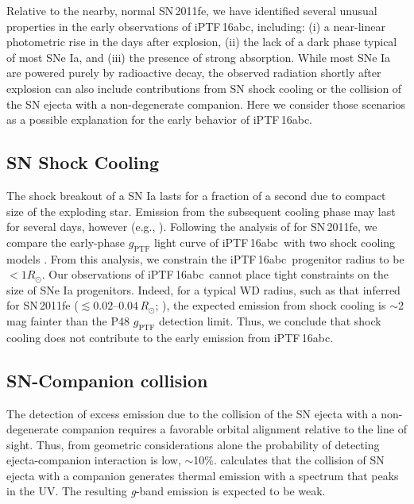 \documentclass[twocolumn]{aastex61}
\newcommand{\sr}{R_\odot}
\newcommand{\abc}{iPTF\,16abc}
\begin{document}
Relative to the nearby, normal SN\,2011fe, we have identified several unusual properties in the early observations of \abc, including: (i) a near-linear photometric rise in the days after explosion, (ii) the lack of a dark phase typical of most SNe Ia, and (iii) the presence of strong  absorption. While most SNe Ia are powered purely by radioactive decay, the observed radiation shortly after explosion can also include contributions 
from SN shock cooling or the collision of the SN ejecta with a non-degenerate companion. Here we consider those scenarios as a possible explanation for the early behavior of \abc. 

\subsection{SN Shock Cooling}

The shock breakout of a SN Ia lasts for a fraction of a second due to
compact size of the exploding star. Emission from the subsequent 
cooling phase may last for several days, however (e.g., 
\citealt{2010ApJ...708..598P}). Following the analysis of \citet{2012ApJ...744L..17B} for SN\,2011fe, we
compare the early-phase $g_\mathrm{PTF}$ light curve of \abc\ with
two shock cooling models \citep{2011ApJ...728...63R, 
2010ApJ...708..598P}. From this analysis, we constrain the \abc\ 
progenitor radius to be $<1\sr$. Our observations of \abc\ cannot 
place tight constraints on the size of SNe Ia progenitors. Indeed, 
for a typical WD radius, such as that inferred for SN\,2011fe 
($\lesssim 0.02$--$0.04\,\sr$; \citealt{2012ApJ...744L..17B, 
2014ApJ...784...85P}), the expected emission from shock cooling is 
$\sim$2 mag fainter than the P48 $g_\mathrm{PTF}$ detection limit. 
Thus, we conclude that shock cooling does not contribute to the 
early emission from \abc.

\subsection{SN-Companion collision}
\label{sec:companion}

The detection of excess emission due to the collision of the SN ejecta 
with a non-degenerate companion requires a favorable orbital 
alignment relative to the line of sight. Thus, from geometric 
considerations alone the probability of detecting ejecta-companion 
interaction is low, $\sim$10\%. \citet{2010ApJ...708.1025K} calculates that the 
collision of SN ejecta with a companion  
generates thermal emission with a spectrum that peaks in the 
UV. The resulting \textit{g}-band emission is expected to be weak.
\end{document}
